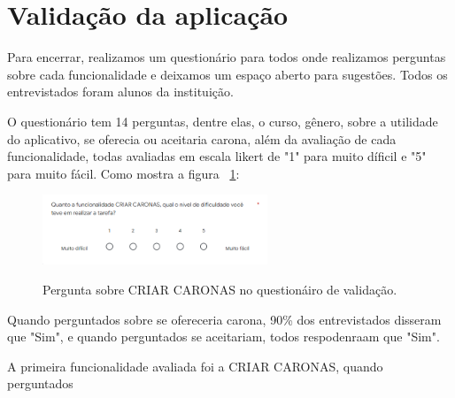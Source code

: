\section{Validação da aplicação}

Para encerrar, realizamos um questionário para todos onde realizamos perguntas sobre cada funcionalidade e deixamos um espaço aberto para sugestões. Todos os entrevistados foram alunos da instituição.

O questionário tem 14 perguntas, dentre elas, o curso, gênero, sobre a utilidade do aplicativo, se oferecia ou aceitaria carona, além da avaliação de cada funcionalidade, todas avaliadas em escala likert de "1" para muito díficil e "5" para muito fácil. Como mostra a figura ~\ref{fig:perg_criar_caronas}:

\begin{figure}[H]
	\centering
	\caption{Pergunta sobre CRIAR CARONAS no questionáiro de validação.}
	\includegraphics[width=0.6\textwidth]{./04-figuras/validacao/perguntas.png}
	\label{fig:perg_criar_caronas}
\end{figure}

Quando perguntados sobre se ofereceria carona, 90\% dos entrevistados disseram que "Sim", e quando perguntados se aceitariam, todos respodenraam que "Sim". 

A primeira funcionalidade avaliada foi a CRIAR CARONAS, quando perguntados






